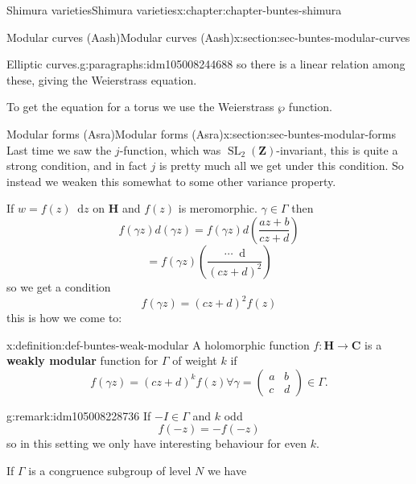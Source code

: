 \documentclass[oneside,10pt,]{book}
\newcommand{\terminology}[1]{\textbf{#1}}
\numberwithin{equation}{section}
\newcommand{\diff}{\mathop{}\!\mathrm{d}}
\newcommand{\ZZ}{\mathbf{Z}}
\newcommand{\CC}{\mathbf{C}}
\newcommand{\HH}{\mathbf{H}}
\DeclareMathOperator{\SL}{SL}
\newcommand{\amp}{&}
\begin{document}
\begin{chapterptx}{Shimura varieties}{}{Shimura varieties}{}{}{x:chapter:chapter-buntes-shimura}
\begin{sectionptx}{Modular curves (Aash)}{}{Modular curves (Aash)}{}{}{x:section:sec-buntes-modular-curves}
\begin{paragraphs}{Elliptic curves.}{g:paragraphs:idm105008244688}
so there is a linear relation among these, giving the Weierstrass equation.%
\par
To get the equation for a torus we use the Weierstrass \(\wp\) function.%
\end{paragraphs}%
\end{sectionptx}
%
%
\typeout{************************************************}
\typeout{************************************************}
%
\begin{sectionptx}{Modular forms (Asra)}{}{Modular forms (Asra)}{}{}{x:section:sec-buntes-modular-forms}
Last time we saw the \(j\)-function, which was \(\SL_2(\ZZ)\)-invariant, this is quite a strong condition, and in fact \(j\) is pretty much all we get under this condition. So instead we weaken this somewhat to some other variance property.%
\par
If \(w = f(z) \diff z\) on \(\HH\) and \(f(z)\) is meromorphic. \(\gamma \in \Gamma\) then%
\begin{equation*}
f(\gamma z) d(\gamma z) = f(\gamma z) d\left( \frac{az+b}{cz+d} \right)
\end{equation*}
%
\begin{equation*}
= f(\gamma z) \left( \frac{\cdots \diff }{(cz+d)^2} \right)
\end{equation*}
so we get a condition%
\begin{equation*}
f(\gamma z) = (cz+d)^2 f(z)
\end{equation*}
this is how we come to:%
\begin{definition}{}{x:definition:def-buntes-weak-modular}%
A holomorphic function \(f\colon \HH \to \CC\) is a \terminology{weakly modular} function for \(\Gamma\) of weight \(k\) if%
\begin{equation*}
f(\gamma z) = (cz+d)^k f(z) \forall \gamma  = \begin{pmatrix} a\amp b \\ c \amp d    \end{pmatrix} \in \Gamma\text{.}
\end{equation*}
%
\end{definition}
\begin{remark}{}{g:remark:idm105008228736}%
If \(-I \in \Gamma\) and \(k\) odd%
\begin{equation*}
f(-z)  = - f(-z)
\end{equation*}
so in this setting we only have interesting behaviour for even \(k\).%
\par
If \(\Gamma\) is a congruence subgroup of level \(N\) we have%

\end{remark}
\end{sectionptx}
\end{chapterptx}
\end{document}
